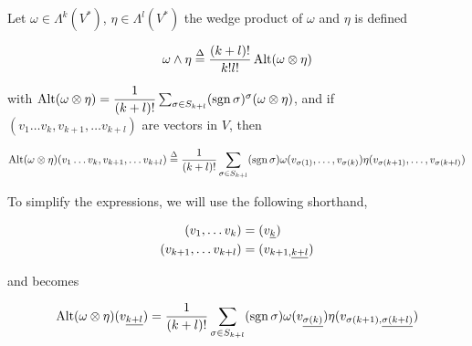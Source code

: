 \documentclass[../main-manifolds.tex]{subfiles}
\begin{document}
\begin{definition}
    Let $\omega\in \Lambda^k(V^*)$, $\eta\in\Lambda^l(V^*)$ the wedge product of $\omega$ and $\eta$ is defined 

\begin{equation}\label{lee-chp14:wedge-product}
    \omega\wedge \eta \overset{\Delta}{=} \dfrac{(k+l)!}{k!l!}\operatorname{Alt}(\omega\otimes \eta) 
\end{equation}

with $\operatorname{Alt}(\omega\otimes\eta) = \dfrac{1}{(k+l)!}\sum_{\sigma\in S_{k+l}}(\operatorname{sgn}\sigma)^\sigma{(\omega\otimes\eta)}$, and if $(v_1\ldots v_k, v_{k+1},\ldots v_{k+l})$ are vectors in $V$, then

\begin{equation}\label{lee-chp14:wedge-product-evaluated}
\operatorname{Alt}(\omega\otimes\eta)(v_1\ldots v_k, v_{k+1},\ldots v_{k+l})\overset{\Delta}{=}\dfrac{1}{(k+l)!}\sum_{\sigma\in S_{k+l}}(\operatorname{sgn}\sigma)\omega(v_{\sigma(1)},\ldots, v_{\sigma(k)})\eta(v_{\sigma(k+1)},\ldots, v_{\sigma(k+l)})
\end{equation}

To simplify the expressions, we will use the following shorthand, 

\begin{align}
    (v_1,\ldots v_k) &= (\Ul{v}[k]) \\
    (v_{k+1},\ldots v_{k+l}) &= (\Ul{v}[k+1][k+l])
\end{align}

and  becomes

\begin{equation}
    \Alt{\omega\otimes\eta}(\Ul{v}[k+l]) = \dfrac{1}{(k+l)!}\sum_{\sigma\in S_{k+l}}(\sgn\sigma)\omega(\Ul{v}[\sigma({k})])\eta(\Ul{v}[\sigma({k+1})][\sigma({k+l})])
\end{equation}

\end{definition}
\end{document}
